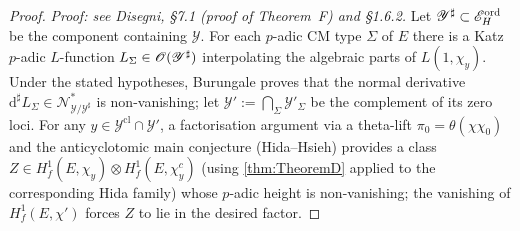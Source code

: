 \begin{proof}
  \textit{Proof: see Disegni, §7.1 (proof of Theorem~F) and §1.6.2.}
  Let $\mathscr{Y}^\sharp \subset \mathscr{E}^{\mathrm{ord}}_H$ be the component containing $\mathscr{Y}$.
  For each $p$-adic CM type $\Sigma$ of $E$ there is a Katz $p$-adic $L$-function
  $L_\Sigma \in \mathscr{O}(\mathscr{Y}^\sharp)$ interpolating the algebraic parts of
  $L(1, \chi_y)$.  Under the stated hypotheses, Burungale \cite{ashay} proves that the
  normal derivative $\mathrm{d}^\sharp L_\Sigma \in \mathscr{N}^*_{\mathscr{Y}/\mathscr{Y}^\sharp}$
  is non-vanishing; let $\mathscr{Y}' := \bigcap_\Sigma \mathscr{Y}'_\Sigma$ be the
  complement of its zero loci.  For any $y \in \mathscr{Y}^{\mathrm{cl}} \cap
  \mathscr{Y}'$, a factorisation argument via a theta-lift $\pi_0 = \theta(\chi\chi_0)$
  and the anticyclotomic main conjecture (Hida--Hsieh) provides a class
  $Z \in H^1_f(E, \chi_y) \otimes H^1_f(E, \chi_y^c)$ (using \cref{thm:TheoremD}
  applied to the corresponding Hida family) whose $p$-adic height is non-vanishing;
  the vanishing of $H^1_f(E, \chi')$ forces $Z$ to lie in the desired factor.
\end{proof}

